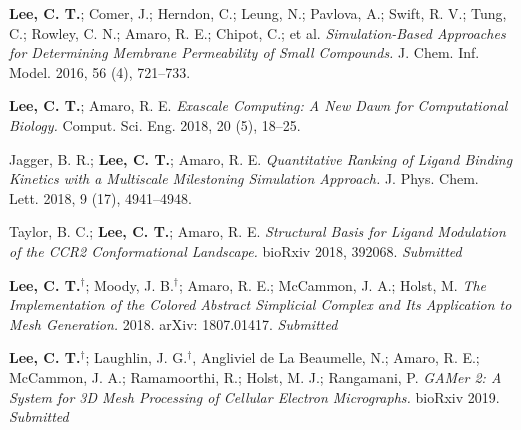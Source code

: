 \begin{frontmatter}
\begin{vitapage}
\begin{publications}
  \item \textbf{Lee, C. T.}; Comer, J.; Herndon, C.; Leung, N.; Pavlova, A.; Swift, R. V.; Tung, C.; Rowley, C. N.; Amaro, R. E.; Chipot, C.; et al. \emph{Simulation-Based Approaches for Determining Membrane Permeability of Small Compounds.} J. Chem. Inf. Model. 2016, 56 (4), 721–733.
  \item \textbf{Lee, C. T.}; Amaro, R. E. \emph{Exascale Computing: A New Dawn for Computational Biology.} Comput. Sci. Eng. 2018, 20 (5), 18–25.
  \item Jagger, B. R.; \textbf{Lee, C. T.}; Amaro, R. E. \emph{Quantitative Ranking of Ligand Binding Kinetics with a Multiscale Milestoning Simulation Approach.} J. Phys. Chem. Lett. 2018, 9 (17), 4941–4948.
  \item Taylor, B. C.; \textbf{Lee, C. T.}; Amaro, R. E. \emph{Structural Basis for Ligand Modulation of the CCR2 Conformational Landscape.} bioRxiv 2018, 392068. \textit{Submitted}
  \item \textbf{Lee, C. T.$^{\dagger}$}; Moody, J. B.$^{\dagger}$; Amaro, R. E.; McCammon, J. A.; Holst, M. \emph{The Implementation of the Colored Abstract Simplicial Complex and Its Application to Mesh Generation.} 2018. arXiv: 1807.01417. \textit{Submitted}
  \item \textbf{Lee, C. T.$^{\dagger}$}; Laughlin, J. G.$^{\dagger}$, Angliviel de La Beaumelle, N.; Amaro, R. E.; McCammon, J. A.; Ramamoorthi, R.; Holst, M. J.; Rangamani, P. \emph{GAMer 2: A System for 3D Mesh Processing of Cellular Electron Micrographs.} bioRxiv 2019. \textit{Submitted}
\end{publications}
\end{vitapage}


\end{frontmatter}
